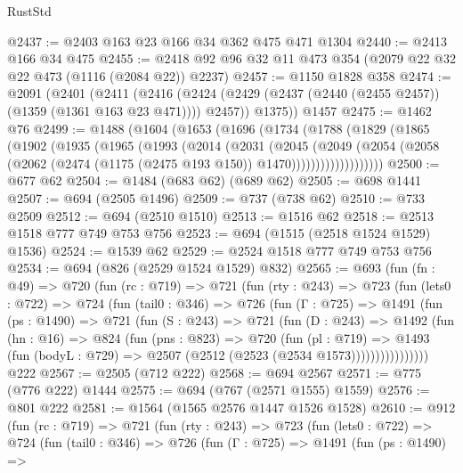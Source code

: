 \begin{lexlean}{RustStd}
\begin{coremodule}
@2437 := @2403 @163 @23 @166 @34 @362 @475 @471 @1304
@2440 := @2413 @166 @34 @475
@2455 := @2418 @92 @96 @32 @11 @473 @354 (@2079 @22 @32 @22 @473 (@1116 (@2084 @22)) @2237)
@2457 := @1150 @1828 @358
@2474 := @2091
    (@2401
      (@2411
        (@2416 (@2424 (@2429 (@2437 (@2440 (@2455 @2457)) (@1359 (@1361 @163 @23 @471)))) @2457))
        @1375))
    @1457
@2475 := @1462 @76
@2499 := @1488
    (@1604
      (@1653
        (@1696
          (@1734
            (@1788
              (@1829
                (@1865
                  (@1902
                    (@1935
                      (@1965
                        (@1993
                          (@2014
                            (@2031
                              (@2045
                                (@2049
                                  (@2054
                                    (@2058
                                      (@2062
                                        (@2474 (@1175 (@2475 @193 @150)) @1470)))))))))))))))))))
@2500 := @677 @62
@2504 := @1484 (@683 @62) (@689 @62)
@2505 := @698 @1441
@2507 := @694 (@2505 @1496)
@2509 := @737 (@738 @62)
@2510 := @733 @2509
@2512 := @694 (@2510 @1510)
@2513 := @1516 @62
@2518 := @2513 @1518 @777 @749 @753 @756
@2523 := @694 (@1515 (@2518 @1524 @1529) @1536)
@2524 := @1539 @62
@2529 := @2524 @1518 @777 @749 @753 @756
@2534 := @694 (@826 (@2529 @1524 @1529) @832)
@2565 := @693
    (fun (fn : @49) =>
    @720
      (fun (rc : @719) =>
      @721
        (fun (rty : @243) =>
        @723
          (fun (lets0 : @722) =>
          @724
            (fun (tail0 : @346) =>
            @726
              (fun (Γ : @725) =>
              @1491
                (fun (ps : @1490) =>
                @721
                  (fun (S : @243) =>
                  @721
                    (fun (D : @243) =>
                    @1492
                      (fun (hn : @16) =>
                      @824
                        (fun (pns : @823) =>
                        @720
                          (fun (pl : @719) =>
                          @1493
                            (fun (bodyL : @729) => @2507 (@2512 (@2523 (@2534 @1573))))))))))))))))
    @222
@2567 := @2505 (@712 @222)
@2568 := @694 @2567
@2571 := @775 (@776 @222) @1444
@2575 := @694 (@767 (@2571 @1555) @1559)
@2576 := @801 @222
@2581 := @1564 (@1565 @2576 @1447 @1526 @1528)
@2610 := @912
    (fun (rc : @719) =>
    @721
      (fun (rty : @243) =>
      @723
        (fun (lets0 : @722) =>
        @724
          (fun (tail0 : @346) =>
          @726
            (fun (Γ : @725) =>
            @1491
              (fun (ps : @1490) =>

\end{coremodule}
\end{lexlean}
